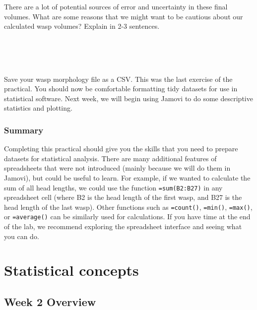 \documentclass[
]{scrbook}
\begin{document}
There are a lot of potential sources of error and uncertainty in these final volumes.
What are some reasons that we might want to be cautious about our calculated wasp volumes?
Explain in 2-3 sentences.

\begin{verbatim}




\end{verbatim}

Save your wasp morphology file as a CSV.
This was the last exercise of the practical.
You should now be comfortable formatting tidy datasets for use in statistical software.
Next week, we will begin using Jamovi to do some descriptive statistics and plotting.

\hypertarget{summary}{%
\section{Summary}\label{summary}}

Completing this practical should give you the skills that you need to prepare datasets for statistical analysis.
There are many additional features of spreadsheets that were not introduced (mainly because we will do them in Jamovi), but could be useful to learn.
For example, if we wanted to calculate the sum of all head lengths, we could use the function \texttt{=sum(B2:B27)} in any spreadsheet cell (where B2 is the head length of the first wasp, and B27 is the head length of the last wasp).
Other functions such as \texttt{=count()}, \texttt{=min()}, \texttt{=max()}, or \texttt{=average()} can be similarly used for calculations.
If you have time at the end of the lab, we recommend exploring the spreadsheet interface and seeing what you can do.

\hypertarget{part-statistical-concepts}{%
\part{Statistical concepts}\label{part-statistical-concepts}}

\hypertarget{Week2}{%
\chapter*{Week 2 Overview}\label{Week2}}
\end{document}
